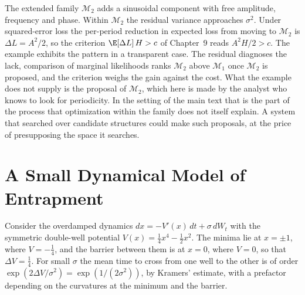 The extended family $\mathcal{M}_2$ adds a sinusoidal component with free amplitude, frequency and phase. Within $\mathcal{M}_2$ the residual variance approaches $\sigma^2$. Under squared-error loss the per-period reduction in expected loss from moving to $\mathcal{M}_2$ is $\Delta L=A^2/2$, so the criterion $\E[\Delta L]\,H>c$ of Chapter~9 reads $A^2H/2>c$. The example exhibits the pattern in a transparent case. The residual diagnoses the lack, comparison of marginal likelihoods ranks $\mathcal{M}_2$ above $\mathcal{M}_1$ once $\mathcal{M}_2$ is proposed, and the criterion weighs the gain against the cost. What the example does not supply is the proposal of $\mathcal{M}_2$, which here is made by the analyst who knows to look for periodicity. In the setting of the main text that is the part of the process that optimization within the family does not itself explain. A system that searched over candidate structures could make such proposals, at the price of presupposing the space it searches.

\chapter{A Small Dynamical Model of Entrapment}

Consider the overdamped dynamics $dx=-V'(x)\,dt+\sigma\,dW_t$ with the symmetric double-well potential $V(x)=\tfrac14x^4-\tfrac12x^2$. The minima lie at $x=\pm1$, where $V=-\tfrac14$, and the barrier between them is at $x=0$, where $V=0$, so that $\Delta V=\tfrac14$. For small $\sigma$ the mean time to cross from one well to the other is of order $\exp(2\Delta V/\sigma^2)=\exp(1/(2\sigma^2))$, by Kramers' estimate, with a prefactor depending on the curvatures at the minimum and the barrier.

